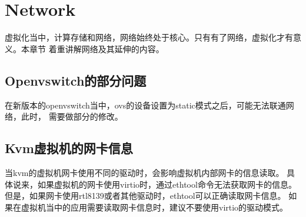 \chapter{Network}
虚拟化当中，计算存储和网络，网络始终处于核心。只有有了网络，虚拟化才有意义。本章节
着重讲解网络及其延伸的内容。

\section{Openvswitch的部分问题}
在新版本的openvswitch当中，ovs的设备设置为static模式之后，可能无法联通网络，此时，
需要做部分的修改。

\section{Kvm虚拟机的网卡信息}
当kvm的虚拟机网卡使用不同的驱动时，会影响虚拟机内部网卡的信息读取。
具体说来，如果虚拟机的网卡使用virtio时，通过ethtool命令无法获取网卡的信息。
但是，如果网卡使用rtl8139或者其他驱动时，ethtool可以正确读取网卡信息。
如果在虚拟机当中的应用需要读取网卡信息时，建议不要使用virtio的驱动模式。
